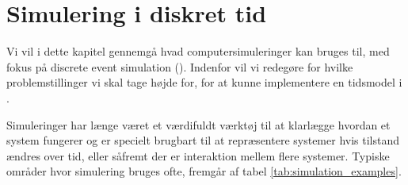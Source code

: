 \chapter{Simulering i diskret tid}
Vi vil i dette kapitel gennemgå hvad computersimuleringer kan bruges til, med fokus på discrete event simulation (\des). Indenfor \des vil vi redegøre for hvilke problemstillinger vi skal tage højde for, for at kunne implementere en \des tidsmodel i \pycsp. 

Simuleringer har længe været et værdifuldt værktøj til at klarlægge hvordan et system fungerer og er specielt brugbart til at repræsentere systemer hvis 
tilstand ændres over tid, eller såfremt der er interaktion mellem flere systemer. Typiske områder hvor simulering bruges ofte, fremgår af tabel \ref{tab:simulation_examples}. 

